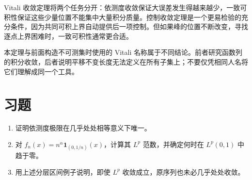Vitali 收敛定理将两个任务分开：依测度收敛保证大误差发生得越来越少，一致可积性保证这些少量位置不能集中大量积分质量。控制收敛定理是一个更易检验的充分条件，因为共同可积上界自动提供后一项控制。但如果峰的位置不断改变，寻找逐点上界困难时，一致可积性通常更合适。

本定理与前面构造不可测集时使用的 Vitali 名称属于不同结论。前者研究函数列的积分收敛，后者说明平移不变长度无法定义在所有子集上；不要仅凭相同人名将它们理解成同一个工具。

\section{习题}
\begin{enumerate}
 \item 证明依测度极限在几乎处处相等意义下唯一。
 \item 对 $f_n(x)=n^\alpha\mathbf1_{(0,1/n)}(x)$，计算其 $L^p$ 范数，并确定何时在 $L^p(0,1)$ 中趋于零。
 \item 用上述分层区间例子说明，即使 $L^p$ 收敛成立，原序列也未必几乎处处收敛。
\end{enumerate}

